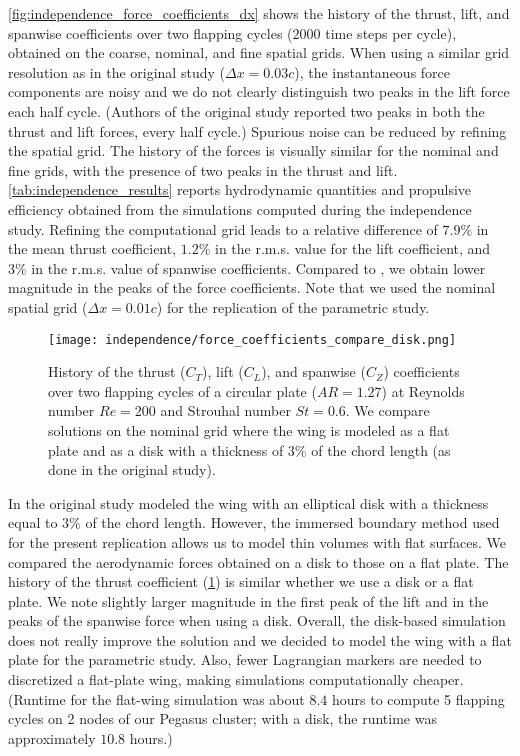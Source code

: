 \cref{fig:independence_force_coefficients_dx} shows the history of the thrust, lift, and spanwise coefficients over two flapping cycles ($2000$ time steps per cycle), obtained on the coarse, nominal, and fine spatial grids.
When using a similar grid resolution as in the original study ($\Delta x = 0.03c$), the instantaneous force components are noisy and we do not clearly distinguish two peaks in the lift force each half cycle.
(Authors of the original study reported two peaks in both the thrust and lift forces, every half cycle.)
Spurious noise can be reduced by refining the spatial grid.
The history of the forces is visually similar for the nominal and fine grids, with the presence of two peaks in the thrust and lift.
\cref{tab:independence_results} reports hydrodynamic quantities and propulsive efficiency obtained from the simulations computed during the independence study.
Refining the computational grid leads to a relative difference of $7.9\%$ in the mean thrust coefficient, $1.2\%$ in the r.m.s. value for the lift coefficient, and $3\%$ in the r.m.s. value of spanwise coefficients.
Compared to \citet{li_dong_2016}, we obtain lower magnitude in the peaks of the force coefficients.
Note that we used the nominal spatial grid ($\Delta x = 0.01c$) for the replication of the parametric study.

\begin{figure}[!h]
  \centering
  \texttt{[image: independence/force\_coefficients\_compare\_disk.png]}
  \caption{History of the thrust ($C_T$), lift ($C_L$), and spanwise ($C_Z$) coefficients over two flapping cycles of a circular plate ($AR = 1.27$) at Reynolds number $Re = 200$ and Strouhal number $St = 0.6$. We compare solutions on the nominal grid where the wing is modeled as a flat plate and as a disk with a thickness of $3\%$ of the chord length (as done in the original study\supercite{li_dong_2016}).}
  \label{fig:independence_force_coefficients_disk}
\end{figure}

In the original study modeled the wing with an elliptical disk with a thickness equal to $3\%$ of the chord length.
However, the immersed boundary method used for the present replication allows us to model thin volumes with flat surfaces.
We compared the aerodynamic forces obtained on a disk to those on a flat plate.
The history of the thrust coefficient (\cref{fig:independence_force_coefficients_disk}) is similar whether we use a disk or a flat plate.
We note slightly larger magnitude in the first peak of the lift and in the peaks of the spanwise force when using a disk.
Overall, the disk-based simulation does not really improve the solution and we decided to model the wing with a flat plate for the parametric study.
Also, fewer Lagrangian markers are needed to discretized a flat-plate wing, making simulations computationally cheaper.
(Runtime for the flat-wing simulation was about $8.4$ hours to compute 5 flapping cycles on 2 nodes of our Pegasus cluster; with a disk, the runtime was approximately $10.8$ hours.)

